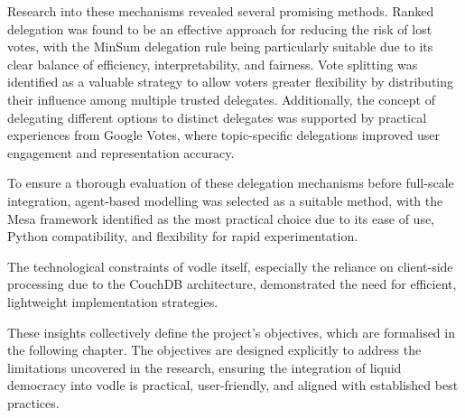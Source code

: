 Research into these mechanisms revealed several promising methods. Ranked delegation was found to be an effective approach for reducing the risk of lost votes, with the MinSum delegation rule being particularly suitable due to its clear balance of efficiency, interpretability, and fairness. Vote splitting was identified as a valuable strategy to allow voters greater flexibility by distributing their influence among multiple trusted delegates. Additionally, the concept of delegating different options to distinct delegates was supported by practical experiences from Google Votes, where topic-specific delegations improved user engagement and representation accuracy.

To ensure a thorough evaluation of these delegation mechanisms before full-scale integration, agent-based modelling was selected as a suitable method, with the Mesa framework identified as the most practical choice due to its ease of use, Python compatibility, and flexibility for rapid experimentation.

The technological constraints of vodle itself, especially the reliance on client-side processing due to the CouchDB architecture, demonstrated the need for efficient, lightweight implementation strategies.

These insights collectively define the project's objectives, which are formalised in the following chapter. The objectives are designed explicitly to address the limitations uncovered in the research, ensuring the integration of liquid democracy into vodle is practical, user-friendly, and aligned with established best practices.